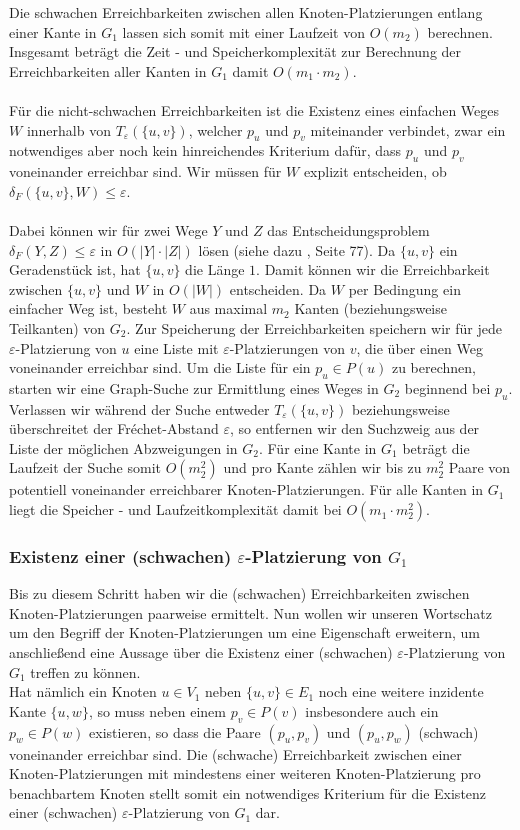 \documentclass[a4paper, 12pt, twoside]{article}
\theoremstyle{Format1} %
\begin{document}
Die schwachen Erreichbarkeiten zwischen allen Knoten-Platzierungen entlang einer Kante in $G_1$ lassen sich somit mit einer Laufzeit von $O(m_2)$ berechnen.
Insgesamt beträgt die Zeit - und Speicherkomplexität zur Berechnung der Erreichbarkeiten aller Kanten in $G_1$ damit $O(m_1 \cdot m_2)$.
\\
\\
Für die nicht-schwachen Erreichbarkeiten ist die Existenz eines einfachen Weges $W$ innerhalb von $T_{\varepsilon}(\{u,v\})$, welcher $p_u$ und $p_v$ miteinander verbindet,
zwar ein notwendiges aber noch kein hinreichendes Kriterium dafür, dass $p_u$ und $p_v$ voneinander erreichbar sind. Wir müssen für $W$ explizit entscheiden,
ob $\delta_F(\{u,v\}, W) \leq \varepsilon$.
\\
\\
Dabei können wir für zwei Wege $Y$ und $Z$ das Entscheidungsproblem $\delta_F(Y,Z) \leq \varepsilon$ in $O(|Y| \cdot |Z|)$ lösen (siehe dazu \cite{Alt}, Seite 77).
Da $\{u,v\}$ ein Geradenstück ist, hat $\{u,v\}$ die Länge $1$. Damit können wir die Erreichbarkeit zwischen $\{u,v\}$ und $W$ in $O(|W|)$ entscheiden.
Da $W$ per Bedingung ein einfacher Weg ist, besteht $W$ aus maximal $m_2$ Kanten (beziehungsweise Teilkanten) von $G_2$.
Zur Speicherung der Erreichbarkeiten speichern wir für jede $\varepsilon$-Platzierung von $u$ eine Liste mit $\varepsilon$-Platzierungen von $v$, die
über einen Weg voneinander erreichbar sind. Um die Liste für ein $p_u \in P(u)$ zu berechnen, starten wir eine Graph-Suche zur Ermittlung eines
Weges in $G_2$ beginnend bei $p_u$. Verlassen wir während der Suche entweder $T_{\varepsilon}(\{u,v\})$ beziehungsweise überschreitet der Fréchet-Abstand $\varepsilon$,
so entfernen wir den Suchzweig aus der Liste der möglichen Abzweigungen in $G_2$.
Für eine Kante in $G_1$ beträgt die Laufzeit der Suche somit $O(m_2^2)$ und pro Kante zählen wir bis zu $m_2^2$ Paare von potentiell voneinander erreichbarer Knoten-Platzierungen.
Für alle Kanten in $G_1$ liegt die Speicher - und Laufzeitkomplexität damit bei $O(m_1 \cdot m_2^2)$.

\subsubsection{Existenz einer (schwachen) $\varepsilon$-Platzierung von $G_1$}
Bis zu diesem Schritt haben wir die (schwachen) Erreichbarkeiten zwischen Knoten-Platzierungen paarweise ermittelt.
Nun wollen wir unseren Wortschatz um den Begriff der Knoten-Platzierungen um eine Eigenschaft erweitern, um anschließend eine Aussage über die Existenz
einer (schwachen) $\varepsilon$-Platzierung von $G_1$ treffen zu können.
\\
Hat nämlich ein Knoten $u \in V_1$ neben $\{u,v\} \in E_1$ noch eine weitere inzidente Kante $\{u,w\}$, so muss neben einem $p_v \in P(v)$ insbesondere auch
ein $p_w \in P(w)$ existieren, so dass die Paare $(p_u,p_v)$ und $(p_u,p_w)$ (schwach) voneinander erreichbar sind. Die (schwache) Erreichbarkeit
zwischen einer Knoten-Platzierungen mit mindestens einer weiteren Knoten-Platzierung pro benachbartem Knoten stellt somit ein notwendiges Kriterium für die Existenz
einer (schwachen) $\varepsilon$-Platzierung von $G_1$ dar.
\end{document}
